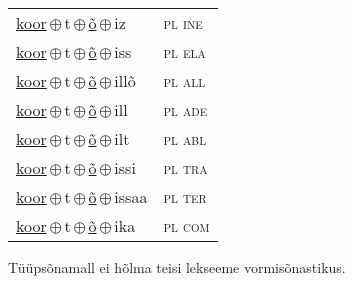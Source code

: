 \begin{minipage}{\textwidth}
\begin{sideways}
\begin{tabular}{l l}
\underline{koor}\,$\oplus$\,t\,$\oplus$\,\underline{õ}\,$\oplus$\,iz & \textsc{ pl ine } \\
\underline{koor}\,$\oplus$\,t\,$\oplus$\,\underline{õ}\,$\oplus$\,iss & \textsc{ pl ela } \\
\underline{koor}\,$\oplus$\,t\,$\oplus$\,\underline{õ}\,$\oplus$\,illõ & \textsc{ pl all } \\
\underline{koor}\,$\oplus$\,t\,$\oplus$\,\underline{õ}\,$\oplus$\,ill & \textsc{ pl ade } \\
\underline{koor}\,$\oplus$\,t\,$\oplus$\,\underline{õ}\,$\oplus$\,ilt & \textsc{ pl abl } \\
\underline{koor}\,$\oplus$\,t\,$\oplus$\,\underline{õ}\,$\oplus$\,issi & \textsc{ pl tra } \\
\underline{koor}\,$\oplus$\,t\,$\oplus$\,\underline{õ}\,$\oplus$\,issaa & \textsc{ pl ter } \\
\underline{koor}\,$\oplus$\,t\,$\oplus$\,\underline{õ}\,$\oplus$\,ika & \textsc{ pl com } \\
\end{tabular}
\end{sideways}
\label{tab:tüüpsõnamall-koorrõ}

\end{minipage}

 
\vspace{1em}
\noindent Tüüpsõnamall  ei hõlma teisi lekseeme vormi\-sõnastikus.
